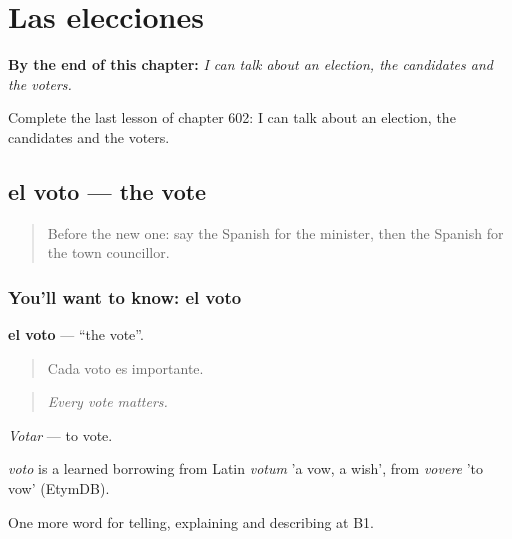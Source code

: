 
\chapter{Las elecciones}
\label{ch:es-las-elecciones}

\begin{chapteropening}
\textbf{By the end of this chapter:} \emph{I can talk about an election, the candidates and the voters.}

Complete the last lesson of chapter 602: I can talk about an election, the candidates and the voters.
\end{chapteropening}

\section[el voto]{el voto — the vote}

\label{lesson:ES-C602-voto}



\begin{quote}
Before the new one: say the Spanish for the minister, then the Spanish for the town councillor.
\end{quote}

\subsection*{You'll want to know: el voto}
\textbf{el voto} — \textquotedblleft{}the vote\textquotedblright{}.

\begin{quote}
Cada voto es importante.
\end{quote}

\begin{quote}
\emph{Every vote matters.}
\end{quote}

\emph{Votar} — to vote.

\begin{cousinweb}
\emph{voto} is a learned borrowing from Latin \emph{votum} 'a vow, a wish', from \emph{vovere} 'to vow' (EtymDB).
\end{cousinweb}

\begin{grammarlens}[title={What you've built}]
One more word for telling, explaining and describing at B1.
\end{grammarlens}

